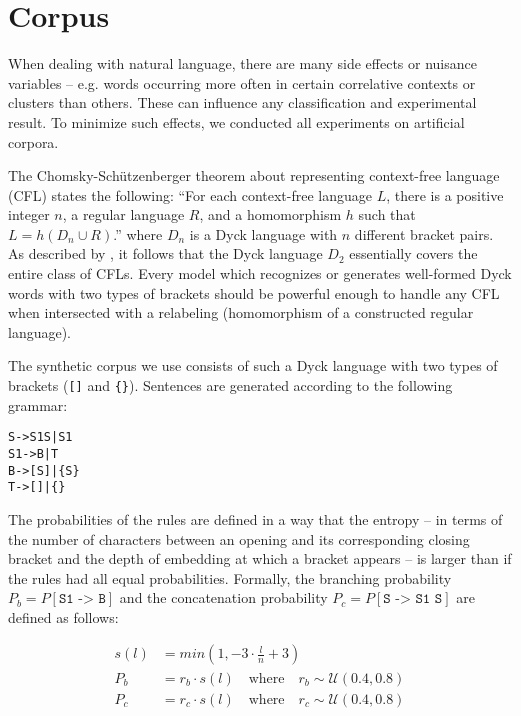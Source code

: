 \documentclass[11pt,a4paper]{article}
\begin{document}
\section{Corpus}
\label{sec:corpus}
When dealing with natural language, there are many side effects or nuisance variables  -- e.g. words occurring more often in certain correlative contexts or clusters than others.  These can influence any classification and experimental result. To minimize such effects, we conducted all experiments on artificial corpora.

The Chomsky-Sch\"utzenberger theorem \cite{chomsky1963algebraic, autebert1997context} about representing context-free language (CFL) states the following: ``For  each context-free language $L$, there is a positive integer $n$, a regular language $R$, and a homomorphism $h$ such that $L=h(D_n \cup R)$.'' where $D_n$ is a Dyck language with $n$ different bracket pairs. As described by \citeauthor{forisek2018what} , it follows that the Dyck language $D_2$ essentially covers the entire class of CFLs. Every model which recognizes or generates well-formed Dyck words with two types of brackets should be powerful enough to handle any CFL when intersected with a relabeling (homomorphism of a constructed regular language).

The synthetic corpus we use consists of such a Dyck language with two types of brackets (\verb|[]| and \verb|{}|). Sentences are generated according to the following grammar:

\begin{samepage}
\begin{alltt}
    S  -> S1 S | S1
    S1 -> B | T
    B  -> [ S ] | \{ S \}
    T  -> [ ] | \{ \}
\end{alltt}
\end{samepage}

The probabilities of the rules are defined in a way that the entropy -- in terms of the number of characters between an opening and its corresponding closing bracket and the depth of embedding at which a bracket appears -- is larger than if the rules had all equal probabilities. Formally, the branching probability $P_b = P[\texttt{S1 -> B}]$ and the concatenation probability $P_c = P[\texttt{S -> S1 S}]$ are defined as follows:

\begin{equation}
\begin{split}
    s(l) &= min(1, -3 \cdot \frac{l}{n}+3) \\
    P_b &= r_b \cdot s(l) \quad \textrm{where} \quad r_b\sim\mathcal{U}(0.4,0.8)\\
    P_c &= r_c \cdot s(l) \quad \textrm{where} \quad r_c\sim\mathcal{U}(0.4,0.8)
\end{split}
\end{equation}
\end{document}
